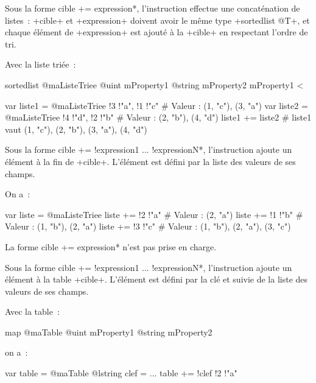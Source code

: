 Sous la forme \ggst*cible += expression*, l'instruction effectue une concaténation de listes~: \ggst+cible+ et \ggst+expression+ doivent avoir le même type \ggst+sortedlist @T+, et chaque élément de \ggst+expression+ est ajouté à la \ggst+cible+ en respectant l'ordre de tri.

Avec la liste triée~:
\begin{galgas3}
sortedlist @maListeTriee {
  @uint mProperty1
  @string mProperty2
}{
  mProperty1 <
}
\end{galgas3}

\begin{galgas3}
var liste1 = @maListeTriee {!3 !"a", !1 !"c"} # Valeur : (1, "c"), (3, "a")
var liste2 = @maListeTriee {!4 !"d", !2 !"b"} # Valeur : (2, "b"), (4, "d")
liste1 += liste2 # liste1 vaut (1, "c"), (2, "b"), (3, "a"), (4, "d")
\end{galgas3}



Sous la forme \ggst*cible += !expression1 ... !expressionN*, l'instruction ajoute un élément à la fin de \ggst+cible+. L'élément est défini par la liste des valeurs de ses champs.


On a~:

\begin{galgas3}
var liste = @maListeTriee {}
liste += !2 !"a" # Valeur : (2, "a")
liste += !1 !"b" # Valeur : (1, "b"), (2, "a")
liste += !3 !"c" # Valeur : (1, "b"), (2, "a"), (3, "c")
\end{galgas3}








La forme \ggst*cible += expression* n'est pas prise en charge.

Sous la forme \ggst*cible += !expression1 ... !expressionN*, l'instruction ajoute un élément à la table \ggst+cible+. L'élément est défini par la clé et suivie de la liste des valeurs de ses champs.


Avec la table~:
\begin{galgas3}
map @maTable {
  @uint mProperty1
  @string mProperty2
}
\end{galgas3}

on a~:

\begin{galgas3}
var table = @maTable {}
@lstring clef = ...
table += !clef !2 !"a"
\end{galgas3}














